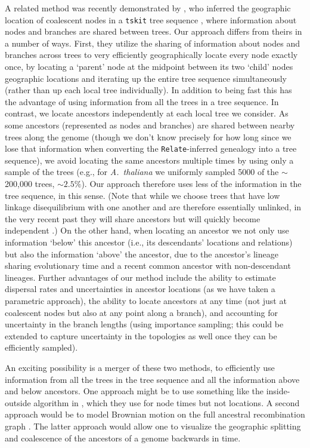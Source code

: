 \documentclass[12pt]{article}
\begin{document}
A related method was recently demonstrated by \cite{wohns2021unified}, who inferred the geographic location of coalescent nodes in a \texttt{tskit} tree sequence \citep{kelleher2018efficient}, where information about nodes and branches are shared between trees.
Our approach differs from theirs in a number of ways. 
First, they utilize the sharing of information about nodes and branches across trees to very efficiently geographically locate every node exactly once, by locating a `parent' node at the midpoint between its two `child' nodes geographic locations and iterating up the entire tree sequence simultaneously (rather than up each local tree individually).
In addition to being fast this has the advantage of using information from all the trees in a tree sequence.
In contrast, we locate ancestors independently at each local tree we consider.
As some ancestors (represented as nodes and branches) are shared between nearby trees along the genome (though we don't know precisely for how long since we lose that information when converting the \texttt{Relate}-inferred genealogy into a tree sequence), we avoid locating the same ancestors multiple times by using only a sample of the trees (e.g., for \textit{A.\ thaliana} we uniformly sampled 5000 of the $\sim$200,000 trees, $\sim2.5\%$).
Our approach therefore uses less of the information in the tree sequence, in this sense.
(Note that while we choose trees that have low linkage disequilibrium with one another and are therefore essentially unlinked, in the very recent past they will share ancestors but will quickly become independent \citep{wakeley2012gene}.)
On the other hand, when locating an ancestor we not only use information `below' this ancestor (i.e., its descendants' locations and relations) but also the information `above' the ancestor, due to the ancestor's lineage sharing evolutionary time and a recent common ancestor with non-descendant lineages.
Further advantages of our method include the ability to estimate dispersal rates and uncertainties in ancestor locations (as we have taken a parametric approach), the ability to locate ancestors at any time (not just at coalescent nodes but also at any point along a branch), and accounting for uncertainty in the branch lengths (using importance sampling; this could be extended to capture uncertainty in the topologies as well once they can be efficiently sampled).

An exciting possibility is a merger of these two methods, to efficiently use information from all the trees in the tree sequence and all the information above and below ancestors. 
One approach might be to use something like the inside-outside algorithm in \citep{wohns2021unified}, which they use for node times but not locations.
A second approach would be to model Brownian motion on the full ancestral recombination graph \citep[e.g. using a program like \texttt{ARGweaver;}][]{rasmussen2014genome}. 
The latter approach would allow one to visualize the geographic splitting and coalescence of the ancestors of a genome backwards in time.
\end{document}
